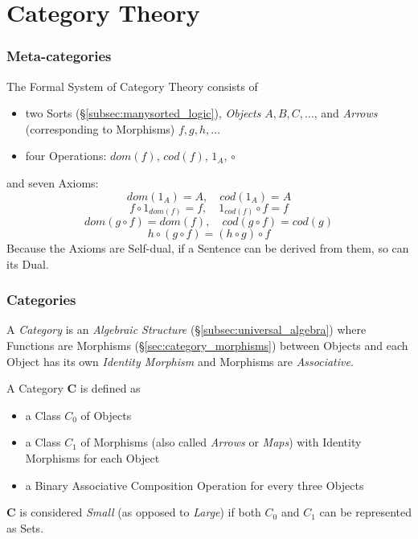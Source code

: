 \part{Category Theory}\label{sec:category_theory}\cite{awodey06}\cite{maclane69}

\section{Meta-categories}\label{sec:meta_category}

The Formal System of Category Theory consists of
\begin{itemize}
\item two Sorts (\S\ref{subsec:manysorted_logic}), \emph{Objects}
  $A,B,C,\ldots$, and \emph{Arrows} (corresponding to Morphisms)
  $f,g,h,\ldots$
\item four Operations: $dom(f)$, $cod(f)$, $1_A$, $\circ$
\end{itemize}
and seven Axioms:
\[
    dom(1_A) = A,\quad cod(1_A) = A
\]\[
    f \circ 1_{dom(f)} = f, \quad 1_{cod(f)} \circ f = f
\]\[
    dom(g\circ f) = dom(f), \quad cod(g \circ f) = cod(g)
\]\[
    h \circ (g \circ f) = (h \circ g) \circ f
\]
Because the Axioms are Self-dual, if a Sentence can be derived from
them, so can its Dual.

\section{Categories}\label{sec:categories}

A \emph{Category} is an \emph{Algebraic Structure}
(\S\ref{subsec:universal_algebra}) where Functions are Morphisms
(\S\ref{sec:category_morphisms}) between Objects and each Object has
its own \emph{Identity Morphism} and Morphisms are \emph{Associative}.

A Category $\mathbf{C}$ is defined as
\begin{itemize}
\item a Class $C_0$ of Objects
\item a Class $C_1$ of Morphisms (also called \emph{Arrows} or
  \emph{Maps}) with Identity Morphisms for each Object
\item a Binary Associative Composition Operation for every three
  Objects
\end{itemize}
$\mathbf{C}$ is considered \emph{Small} (as opposed to \emph{Large})
if both $C_0$ and $C_1$ can be represented as Sets.

